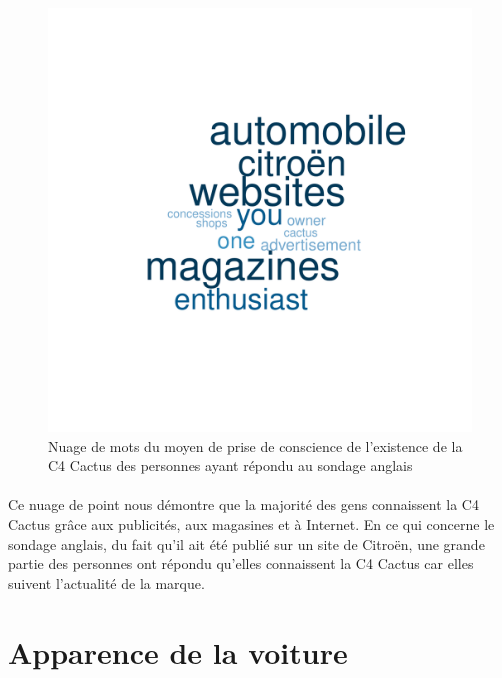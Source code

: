 \documentclass[12pt]{article}\usepackage[]{graphicx}\usepackage[]{color}
\makeatletter
\def\maxwidth{ %
  \ifdim\Gin@nat@width>\linewidth
    \linewidth
  \else
    \Gin@nat@width
  \fi
}
\newenvironment{knitrout}{}{} %
\makeatother
\begin{document}
\begin{knitrout}
\color{fgcolor}\begin{figure}[H]
\includegraphics[width=\maxwidth]{figure/means_en-1} \caption[Nuage de mots du moyen de prise de conscience de l'existence de la C4 Cactus des personnes ayant répondu au sondage anglais]{Nuage de mots du moyen de prise de conscience de l'existence de la C4 Cactus des personnes ayant répondu au sondage anglais}\label{fig:means en}
\end{figure}


\end{knitrout}

\paragraph{} Ce nuage de point nous démontre que la majorité des gens
connaissent la C4 Cactus grâce aux publicités, aux magasines et à Internet. En
ce qui concerne le sondage anglais, du fait qu'il ait été publié sur un site de
Citroën, une grande partie des personnes ont répondu qu'elles connaissent la C4
Cactus car elles suivent l'actualité de la marque.

\break
\section{Apparence de la voiture}
\end{document}
